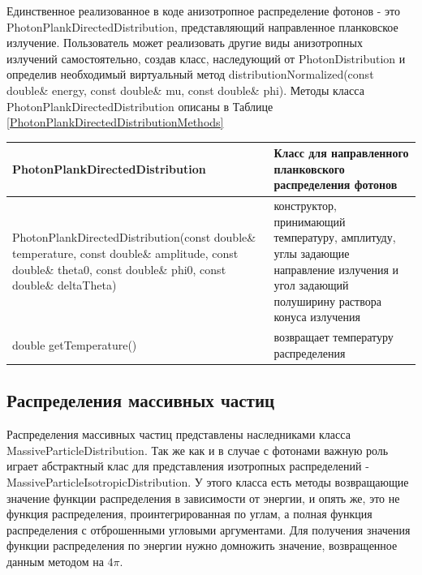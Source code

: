 Единственное реализованное в коде анизотропное распределение фотонов - это PhotonPlankDirectedDistribution, представляющий направленное планковское излучение. Пользователь может реализовать другие виды анизотропных излучений самостоятельно, создав класс, наследующий от PhotonDistribution и определив необходимый виртуальный метод distributionNormalized(const double\& energy, const double\& mu, const double\& phi). Методы класса PhotonPlankDirectedDistribution описаны в Таблице \ref{PhotonPlankDirectedDistributionMethods}

\begin{small}
		\label{PhotonPlankDirectedDistributionMethods}
			\begin{xtabular}{|p{0.45\textwidth}|p{0.55\textwidth}|}
				\hline
				\textbf{PhotonPlankDirectedDistribution} & Класс для направленного планковского распределения фотонов\\
				\hline
				PhotonPlankDirectedDistribution(const double\& temperature, const double\& amplitude, const double\& theta0, const double\& phi0, const double\& deltaTheta) & конструктор, принимающий температуру, амплитуду, углы задающие направление излучения и угол задающий полуширину раствора конуса излучения\\
				\hline
				double getTemperature() & возвращает температуру распределения\\
				\hline
	\end{xtabular}
\end{small}

\subsection{Распределения массивных частиц}
Распределения массивных частиц представлены наследниками класса MassiveParticleDistribution. Так же как и в случае с фотонами важную роль играет абстрактный клас для представления изотропных распределений - MassiveParticleIsotropicDistribution. У этого класса есть методы возвращающие значение функции распределения в зависимости от энергии, и опять же, это не функция распределения, проинтегрированная по углам, а полная функция распределения с отброшенными угловыми аргументами. Для получения значения функции распределения по энергии нужно домножить значение, возвращенное данным методом на $4 \pi$. 

